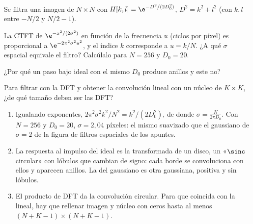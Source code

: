 \documentclass[11pt,a4paper]{scrartcl}
\begin{document}
\begin{ejercicio}
  Se filtra una imagen de $N\times N$ con $H[k,l]=\e^{-D^2/(2D_0^2)}$, $D^2=k^2+l^2$ (con $k,l$ entre $-N/2$ y $N/2-1$).
  \begin{incisos}[1]
    \item La CTFT de $\e^{-x^2/(2\sigma^2)}$ en función de la frecuencia $u$ (ciclos por píxel) es proporcional a $\e^{-2\pi^2\sigma^2u^2}$, y el índice $k$ corresponde a $u=k/N$. ¿A qué $\sigma$ espacial equivale el filtro? Calcúlalo para $N=256$ y $D_0=20$.
    \item ¿Por qué un paso bajo ideal con el mismo $D_0$ produce anillos y este no?
    \item Para filtrar con la DFT y obtener la convolución lineal con un núcleo de $K\times K$, ¿de qué tamaño deben ser las DFT?
  \end{incisos}
\end{ejercicio}
\begin{solucion}
  \begin{enumerate}[label=\alph*)]
    \item Igualando exponentes, $2\pi^2\sigma^2k^2/N^2=k^2/(2D_0^2)$, de donde $\sigma=\frac{N}{2\pi D_0}$. Con $N=256$ y $D_0=20$, $\sigma=2{,}04$ píxeles: el mismo suavizado que el gaussiano de $\sigma=2$ de la figura de filtros espaciales de los apuntes.
    \item La respuesta al impulso del ideal es la transformada de un disco, un «$\sinc$ circular» con lóbulos que cambian de signo: cada borde se convoluciona con ellos y aparecen anillos. La del gaussiano es otra gaussiana, positiva y sin lóbulos.
    \item El producto de DFT da la convolución circular. Para que coincida con la lineal, hay que rellenar imagen y núcleo con ceros hasta al menos $(N+K-1)\times(N+K-1)$.
  \end{enumerate}
\end{solucion}
\end{document}
